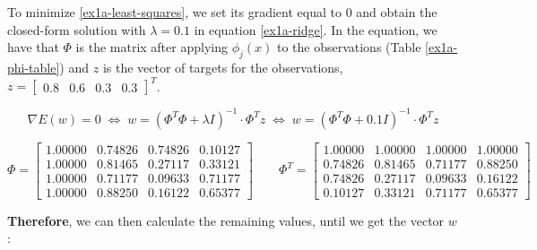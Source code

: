 \documentclass[12pt]{article}
\begin{document}
\begin{enumerate}[leftmargin=\labelsep]
\begin{enumerate}
              To minimize \eqref{ex1a-least-squares}, we set its gradient equal to 0 and obtain the closed-form solution with $\lambda = 0.1$ in equation \eqref{ex1a-ridge}.
              In the equation, we have that $\Phi$ is the matrix after applying $\phi_j(x)$ to the observations (Table \ref{ex1a-phi-table}) and $z$ is the vector
              of targets for the observations, $z = \begin{bmatrix}0.8 & 0.6 & 0.3 & 0.3\end{bmatrix}^T$.

              \vskip -0.2cm
              \begin{equation}\label{ex1a-ridge}
                  \nabla E(w) = 0 \;\Leftrightarrow\; w = \left(\Phi^T \Phi + \lambda I\right)^{-1} \cdot \Phi^T z
                  \;\Leftrightarrow\; w = \left(\Phi^T \Phi + 0.1 I\right)^{-1} \cdot \Phi^T z
              \end{equation}

              \vskip -0.2cm
              $$
                  \Phi = \begin{bmatrix}
                      1.00000 & 0.74826 & 0.74826 & 0.10127 \\
                      1.00000 & 0.81465 & 0.27117 & 0.33121 \\
                      1.00000 & 0.71177 & 0.09633 & 0.71177 \\
                      1.00000 & 0.88250 & 0.16122 & 0.65377
                  \end{bmatrix}
                  \quad
                  \quad
                  \Phi^T = \begin{bmatrix}
                      1.00000 & 1.00000 & 1.00000 & 1.00000 \\
                      0.74826 & 0.81465 & 0.71177 & 0.88250 \\
                      0.74826 & 0.27117 & 0.09633 & 0.16122 \\
                      0.10127 & 0.33121 & 0.71177 & 0.65377
                  \end{bmatrix}
              $$

              \textbf{Therefore}, we can then calculate the remaining values, until we get the vector $w$:


\end{enumerate}
\end{enumerate}
\end{document}
